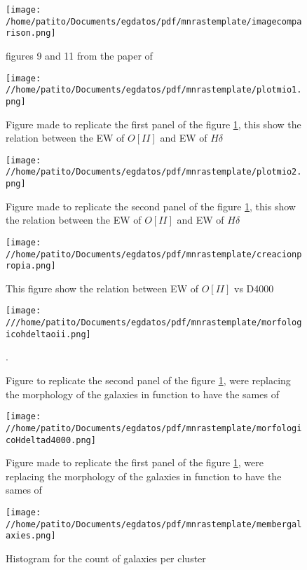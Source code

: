 \documentclass[fleqn,usenatbib]{mnras}
\begin{document}
\begin{figure}
	\texttt{[image: /home/patito/Documents/egdatos/pdf/mnrastemplate/imagecomparison.png]}
    \caption{figures 9 and 11 from the paper of \citet{Balogh}}
    \label{figsbaloghs}
\end{figure}

\begin{figure}
	\texttt{[image: //home/patito/Documents/egdatos/pdf/mnrastemplate/plotmio1.png]}
	\caption{Figure made to replicate the first panel of the figure \ref{figsbaloghs}, this show the relation between the EW of $O[II]$ and EW of $H\delta$}
    \label{plotmio1}
\end{figure}

\begin{figure}
	\texttt{[image: //home/patito/Documents/egdatos/pdf/mnrastemplate/plotmio2.png]}
	\caption{Figure made to replicate the second panel of the figure \ref{figsbaloghs}, this show the relation between the EW of $O[II]$ and EW of $H\delta$}
    \label{plotmio2}
\end{figure}

\begin{figure}
	\texttt{[image: //home/patito/Documents/egdatos/pdf/mnrastemplate/creacionpropia.png]}
	\caption{This figure show the relation between EW of $O[II]$ vs D4000}
    \label{plotcreado}
\end{figure}


\begin{figure}
	\texttt{[image: ///home/patito/Documents/egdatos/pdf/mnrastemplate/morfologicohdeltaoii.png]}
	\caption{Figure to replicate the second panel of the figure \ref{figsbaloghs}, were replacing the morphology of the galaxies in function to have the sames of \citet{Balogh}}.
	\label{plotmorph1}
\end{figure}

\begin{figure}
	\texttt{[image: //home/patito/Documents/egdatos/pdf/mnrastemplate/morfologicoHdeltad4000.png]}
	\caption{Figure made to replicate the first panel of the figure \ref{figsbaloghs}, were replacing the morphology of the galaxies in function to have the sames of \citet{Balogh}}
	\label{plotmorph2}
\end{figure}

\begin{figure}
	\texttt{[image: //home/patito/Documents/egdatos/pdf/mnrastemplate/membergalaxies.png]}
	\caption{Histogram for the count of galaxies per cluster}
	\label{histogram}
\end{figure}
\end{document}
